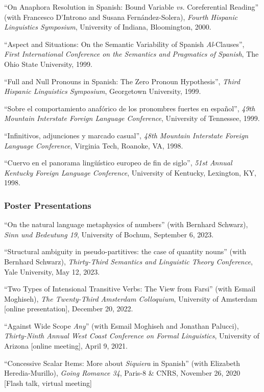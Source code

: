 \documentclass[11pt]{article}
\begin{document}
``On Anaphora Resolution in Spanish: Bound Variable \textit{vs.} Coreferential Reading'' (with Francesco D'Introno and Susana Fern\'andez-Solera), \textit{Fourth Hispanic Linguistics Symposium}, University of Indiana, Bloomington, 2000. 

``Aspect and Situations: On the Semantic Variability of Spanish \textit{Al}-Clauses'', \textit{First International Conference on the Semantics and Pragmatics of Spanish}, The Ohio State University, 1999. 

``Full and Null Pronouns in Spanish: The Zero Pronoun Hypothesis'', \textit{Third Hispanic Linguistics Symposium}, Georgetown University, 1999. 

``Sobre el comportamiento anaf\'orico de los pronombres fuertes en espa\~nol'', \textit{49th Mountain Interstate Foreign Language Conference}, University of Tennessee, 1999. 

``Infinitivos, adjunciones y marcado casual'', \textit{48th Mountain Interstate Foreign Language Conference}, Virginia Tech, Roanoke, VA, 1998. 

``Cuervo en el panorama ling\"{u}\'istico europeo de fin de siglo'', \textit{51st Annual Kentucky Foreign Language Conference}, University of Kentucky, Lexington, KY, 1998. 

\subsubsection*{Poster Presentations}

``On the natural language metaphysics of numbers'' (with Bernhard Schwarz), \textit{Sinn und Bedeutung 19}, University of Bochum, September 6, 2023.

``Structural ambiguity in pseudo-partitives:
the case of quantity nouns'' (with Bernhard Schwarz), \textit{Thirty-Third Semantics and Linguistic Theory Conference}, Yale University, May 12, 2023.


``Two Types of Intensional Transitive Verbs: The View from Farsi'' (with Esmail Moghiseh), \textit{The Twenty-Third Amsterdam Colloquium}, University of Amsterdam [online presentation], December 20, 2022.

``Against Wide Scope \textit{Any}'' (with Esmail Moghiseh and Jonathan Palucci), \textit{Thirty-Ninth Annual West Coast Conference on Formal Linguistics}, University of Arizona [online meeting], April 9, 2021.

``Concessive Scalar Items: More about \textit{Siquiera} in Spanish'' (with Elizabeth Heredia-Murillo),
\textit{Going Romance 34}, Paris-8 \& CNRS, November 26, 2020 [Flash talk, virtual meeting]
\end{document}
